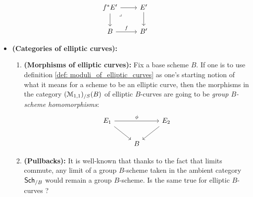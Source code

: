 \begin{definition}
\begin{enumerate}
$$\begin{tikzcd}
                                    	{f^*E'} & {E'} \\
                                    	B & {B'}
                                    	\arrow[from=1-1, to=2-1]
                                    	\arrow["f", from=2-1, to=2-2]
                                    	\arrow[from=1-2, to=2-2]
                                    	\arrow[from=1-1, to=1-2]
                                    	\arrow["\lrcorner"{anchor=center, pos=0.125}, draw=none, from=1-1, to=2-2]
                                    \end{tikzcd}
                                $$
                        \end{enumerate}
                    \end{definition}
                    \begin{remark} \label{remark: moduli_of_elliptic_curves_disambiguations}
                        \noindent
                        \begin{itemize}
                            \item \textbf{(Categories of elliptic curves):}
                                \begin{enumerate}
                                    \item \textbf{(Morphisms of elliptic curves):} Fix a base scheme $B$. If one is to use definition \ref{def: moduli_of_elliptic_curves} as one's starting notion of what it means for a scheme to be an elliptic curve, then the morphisms in the category $(\mathcal{M}_{1, 1})_{/S}(B)$ of elliptic $B$-curves are going to be \textit{group $B$-scheme homomorphisms}:
                                        $$
                                            \begin{tikzcd}
                                            	{E_1} && {E_2} \\
                                            	& B
                                            	\arrow[from=1-3, to=2-2]
                                            	\arrow["\phi", from=1-1, to=1-3]
                                            	\arrow[from=1-1, to=2-2]
                                            \end{tikzcd}
                                        $$
                                    \item \textbf{(Pullbacks):} It is well-known that thanks to the fact that limits commute, any limit of a group $B$-scheme taken in the ambient category $\mathsf{Sch}_{/B}$ would remain a group $B$-scheme. Is the same true for elliptic $B$-curves ? 
                                    

\end{enumerate}
\end{itemize}
\end{remark}
